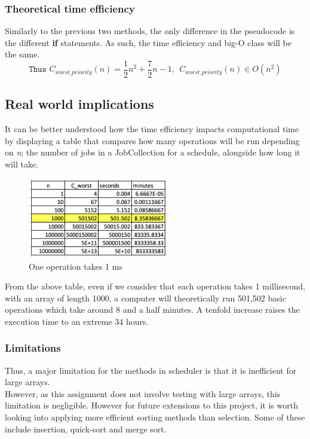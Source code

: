 \documentclass[a4paper]{article}
\begin{document}
\subsubsection{Theoretical time efficiency}
Similarly to the previous two methods, the only difference in the pseudocode is the different \textbf{if} statements. As such, the time efficiency and big-O class will be the same.
\[ 
   \texttt{Thus } C_{worst\_priority}(n)= \frac{1}{2}n^2+\frac{7}{2}n - 1, 
   ~~ C_{worst\_priority}(n) \in O(n^2)
\]

\pagebreak

\subsection{Real world implications}
It can be better understood how the time efficiency impacts computational time by displaying a table that compares how many operations will be run depending on \textit{n}; the number of jobs in a JobCollection for a schedule, alongside how long it will take.

\begin{figure}[H]
   \centering
   \includegraphics[height=3.5cm]{images/table-2.png}
   \caption{One operation takes 1 ms}
\end{figure}

From the above table, even if we consider that each operation takes 1 millisecond, with an array of length 1000, a computer will theoretically run 501,502 basic operations which take around 8 and a half minutes. A tenfold increase raises the execution time to an extreme 34 hours.
\subsubsection{Limitations}
Thus, a major limitation for the methods in scheduler is that it is inefficient for large arrays.
\\[3pt]
However, as this assignment does not involve testing with large arrays, this limitation is negligible. However for future extensions to this project, it is worth looking into applying more efficient sorting methods than selection. Some of these include insertion, quick-sort and merge sort. 
\end{document}
